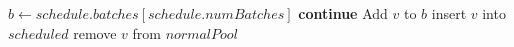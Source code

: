 \documentclass[fleqn,10pt]{olplainarticle}
\begin{document}
\begin{algorithm}[H]
\caption{\textsc{FillBatchWithNormals}$(normalPool,\ schedule,\ proposals,\ scheduled)$}
\begin{algorithmic}[1]
\State $b \gets schedule.batches[schedule.numBatches]$
        \State \textbf{continue}
    \EndIf
        \State Add $v$ to $b$
        \State insert $v$ into $scheduled$
        \State remove $v$ from $normalPool$
    \EndIf
\EndFor
\end{algorithmic}
\end{algorithm}

\end{document}
